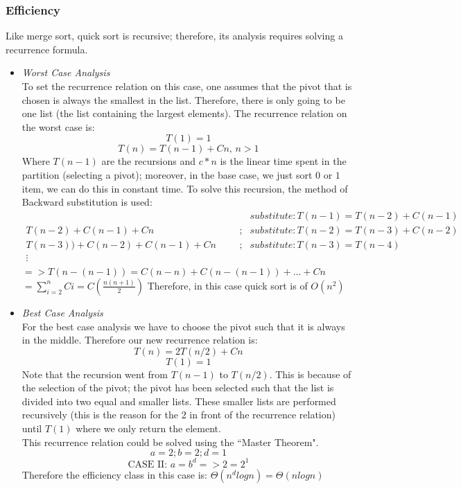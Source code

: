 \documentclass{article}
\begin{document}
\subsubsection{Efficiency}
Like merge sort, quick sort is recursive; therefore, its analysis requires
solving a recurrence formula.\\
\begin{itemize}
\item\emph{Worst Case Analysis}\\
To set the recurrence relation on this case, one assumes that the pivot
that is chosen is always the smallest in the list. Therefore, there is 
only going to be one list (the list containing the largest elements).
The recurrence relation on the worst case is:
$$T(1) = 1$$
$$T(n) = T(n-1) + Cn\mbox{, } n > 1$$
Where $T(n-1)$ are the recursions and $c*n$ is the linear time spent in
the partition (selecting a pivot); moreover, in the base case, we just
sort $0$ or $1$ item, we can do this in constant time. To solve this
recursion, 
the method of Backward substitution is used:\\
$$\begin{array}{lclcl}
 &  & &  & substitute: T(n - 1) = T(n - 2) + C(n - 1)\\
T(n - 2) + C(n - 1) + Cn & & &;& substitute: T(n - 2) = T(n - 3) + C(n -
2)\\
T(n - 3)) + C(n - 2) + C(n - 1) + Cn & & &;& substitute: T(n - 3) = T(n
- 4) \\
\vdots & & & & \\
\end{array}$$
$=> T(n - (n - 1)) = C(n - n) + C(n-(n - 1)) + ... + Cn$\\
$= \displaystyle\sum_{i = 2}^{n}Ci = C\left(\frac{n(n + 1)}{2}\right)$
Therefore, in this case quick sort is of $O(n^2)$\\

\item\emph{Best Case Analysis}\\
For the best case analysis we have to choose the pivot such that it is
always in the middle. Therefore our new recurrence relation is:
$$T(n) = 2T(n/2) + Cn$$
$$T(1) = 1$$
Note that the recursion went from $T(n - 1)$ to $T(n/2)$. This is
because
of the selection of the pivot; the pivot has been selected such that the
list is divided into two equal and smaller lists. These smaller lists
are
performed recursively (this is the reason for the $2$ in front of the
recurrence relation) until $T(1)$ where we only return the element.\\
This recurrence relation could be solved using the ``Master
Theorem"\cite{levitin}.\\
$$a = 2; b = 2; d = 1$$
$$\mbox{CASE II: } a = b^d  =>  2 = 2^1$$
Therefore the efficiency class in this case is: $\Theta(n^dlogn) =
\Theta(nlogn)$\\

\end{itemize}
\end{document}
